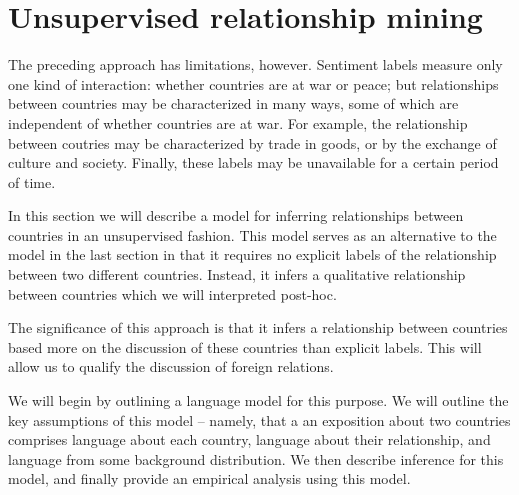 \section*{Unsupervised relationship mining}


The preceding approach has limitations, however.  Sentiment labels
measure only one kind of interaction: whether countries are at war or
peace; but relationships between countries may be characterized in
many ways, some of which are independent of whether countries are at
war.  For example, the relationship between coutries may be
characterized by trade in goods, or by the exchange of culture and
society. Finally, these labels may be unavailable for a certain period
of time.

In this section we will describe a model for inferring relationships
between countries in an unsupervised fashion.  This model serves as an
alternative to the model in the last section in that it requires no
explicit labels of the relationship between two different countries.
Instead, it infers a qualitative relationship between countries which
we will interpreted post-hoc.

The significance of this approach is that it infers a relationship
between countries based more on the discussion of these countries than
explicit labels.  This will allow us to qualify the discussion of
foreign relations.

We will begin by outlining a language model for this purpose.  We will
outline the key assumptions of this model -- namely, that a an
exposition about two countries comprises language about each country,
language about their relationship, and language from some background
distribution. We then describe inference for this model, and finally
provide an empirical analysis using this model.

